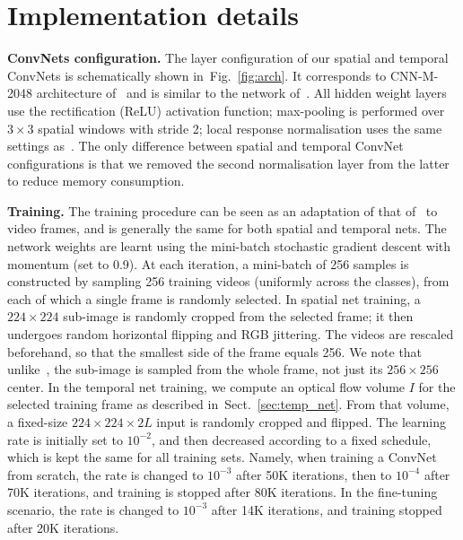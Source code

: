 \documentclass{article} %
\makeatletter
\newcommand{\figref}[1]{Fig.~\ref{#1}}
\newcommand{\sref}[1]{Sect.~\ref{#1}}
\newcommand*{\vs}{\emph{vs}.\@\xspace}
\makeatother
\begin{document}
\section{Implementation details}
\label{sec:impl}
\label{sec:impl:spatial}
\label{sec:impl:temporal}

\noindent\textbf{ConvNets configuration.}
The layer configuration of our spatial and temporal ConvNets is schematically shown in~\figref{fig:arch}.
It corresponds to CNN-M-2048 architecture of~\cite{Chatfield14} and is similar to the network of~\cite{Zeiler13}.
All hidden weight layers use the rectification (ReLU) activation function; max-pooling is performed over $3\times 3$ spatial windows with stride 2; local response
normalisation uses the same settings as~\cite{Krizhevsky12}.
The only difference between spatial and temporal ConvNet configurations is that we removed the second normalisation layer from the latter to reduce memory consumption. 

\noindent\textbf{Training.} The training procedure can be seen as an adaptation of that of~\cite{Krizhevsky12} to video frames, and is generally the same for both spatial and temporal nets.
The network weights are learnt using the mini-batch stochastic gradient descent with momentum (set to 0.9).
At each iteration, a mini-batch of 256 samples is constructed by sampling 256 training videos (uniformly across the classes), from each of which a single frame is randomly selected.
In spatial net training,  a $224 \times 224$ sub-image is randomly cropped from the selected frame; it then undergoes random horizontal flipping and RGB jittering.
The videos are rescaled beforehand, so that the smallest side of the frame equals 256. 
We note that unlike~\cite{Krizhevsky12}, the sub-image is sampled from the whole frame, not just its $256 \times 256$ center.
In the temporal net training, we compute an optical flow volume $I$ for the selected training frame as described in~\sref{sec:temp_net}.
From that volume, a fixed-size $224\times224\times2L$ input is randomly cropped and flipped.
The learning rate is initially set to $10^{-2}$, and then decreased according to a fixed schedule, which is kept the same for all training sets. 
Namely, when training a ConvNet from scratch, the rate is changed to $10^{-3}$ after 50K iterations, then to $10^{-4}$ after 70K iterations, and training is stopped after 80K iterations.
In the fine-tuning scenario, the rate is changed to $10^{-3}$ after 14K iterations, and training stopped after 20K iterations.
\end{document}
